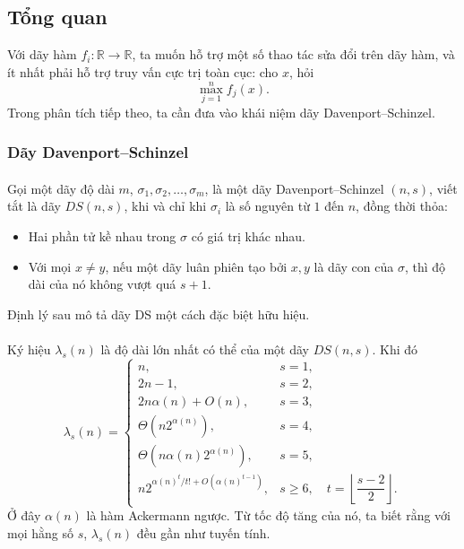 \documentclass[11pt]{article}
\begin{document}
\subsection{Tổng quan}

Với dãy hàm \(f_i:\mathbb{R}\to\mathbb{R}\), ta muốn hỗ trợ một số thao tác sửa
đổi trên dãy hàm, và ít nhất phải hỗ trợ truy vấn cực trị toàn cục: cho \(x\),
hỏi
\[
  \max_{j=1}^n f_j(x).
\]
Trong phân tích tiếp theo, ta cần đưa vào khái niệm dãy Davenport--Schinzel.

\subsubsection{Dãy Davenport--Schinzel}

\paragraph{}
Gọi một dãy độ dài \(m\),
\(\sigma_1,\sigma_2,\ldots,\sigma_m\), là một dãy Davenport--Schinzel
\((n,s)\), viết tắt là dãy \(DS(n,s)\), khi và chỉ khi \(\sigma_i\) là số
nguyên từ \(1\) đến \(n\), đồng thời thỏa:

\begin{itemize}
  \item Hai phần tử kề nhau trong \(\sigma\) có giá trị khác nhau.
  \item Với mọi \(x\ne y\), nếu một dãy luân phiên tạo bởi \(x,y\) là dãy con
  của \(\sigma\), thì độ dài của nó không vượt quá \(s+1\).
\end{itemize}

Định lý sau mô tả dãy DS một cách đặc biệt hữu hiệu.

\paragraph{}
Ký hiệu \(\lambda_s(n)\) là độ dài lớn nhất có thể của một dãy \(DS(n,s)\). Khi
đó
\[
\lambda_s(n)=
\begin{cases}
n, & s=1,\\
2n-1, & s=2,\\
2n\alpha(n)+O(n), & s=3,\\
\Theta(n2^{\alpha(n)}), & s=4,\\
\Theta(n\alpha(n)2^{\alpha(n)}), & s=5,\\
n2^{\alpha(n)^t/t!+O(\alpha(n)^{t-1})}, & s\ge 6,\quad
  t=\left\lfloor\dfrac{s-2}{2}\right\rfloor.
\end{cases}
\]
Ở đây \(\alpha(n)\) là hàm Ackermann ngược. Từ tốc độ tăng của nó, ta biết rằng
với mọi hằng số \(s\), \(\lambda_s(n)\) đều gần như tuyến tính.
\end{document}
